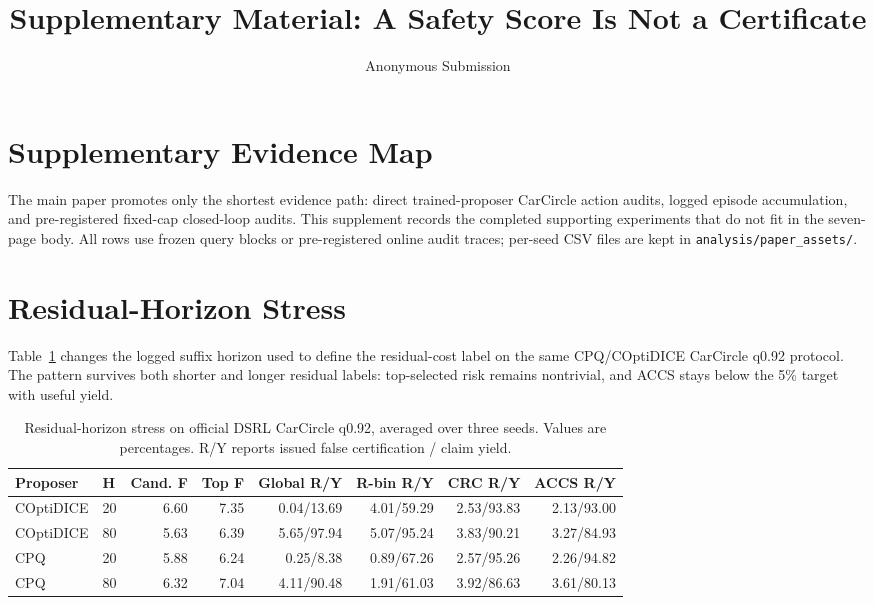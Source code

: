 \documentclass[letterpaper]{article}
\title{Supplementary Material: A Safety Score Is Not a Certificate}
\author{
    Anonymous Submission
}
\begin{document}
\maketitle
\enlargethispage{1\baselineskip}

\section{Supplementary Evidence Map}

The main paper promotes only the shortest evidence path: direct trained-proposer
CarCircle action audits, logged episode accumulation, and pre-registered
fixed-cap closed-loop audits. This supplement records the completed supporting
experiments that do not fit in the seven-page body. All rows use frozen query
blocks or pre-registered online audit traces; per-seed CSV files are kept in
\texttt{analysis/paper\_assets/}.

\section{Residual-Horizon Stress}

Table~\ref{tab:app-horizon} changes the logged suffix horizon used to define the
residual-cost label on the same CPQ/COptiDICE CarCircle q0.92 protocol. The
pattern survives both shorter and longer residual labels: top-selected risk
remains nontrivial, and ACCS stays below the 5\% target with useful yield.

\begin{table}[t]
\centering
\small
\setlength{\tabcolsep}{4pt}
\begin{tabular}{llrrrrrr}
\toprule
Proposer & H & Cand. F & Top F & Global R/Y & R-bin R/Y & CRC R/Y & ACCS R/Y \\
\midrule
COptiDICE & 20 & 6.60 & 7.35 & 0.04/13.69 & 4.01/59.29 & 2.53/93.83 & 2.13/93.00 \\
COptiDICE & 80 & 5.63 & 6.39 & 5.65/97.94 & 5.07/95.24 & 3.83/90.21 & 3.27/84.93 \\
CPQ & 20 & 5.88 & 6.24 & 0.25/8.38 & 0.89/67.26 & 2.57/95.26 & 2.26/94.82 \\
CPQ & 80 & 6.32 & 7.04 & 4.11/90.48 & 1.91/61.03 & 3.92/86.63 & 3.61/80.13 \\
\bottomrule
\end{tabular}
\caption{Residual-horizon stress on official DSRL CarCircle q0.92, averaged
over three seeds. Values are percentages. R/Y reports issued false
certification / claim yield.}
\label{tab:app-horizon}
\end{table}
\end{document}
